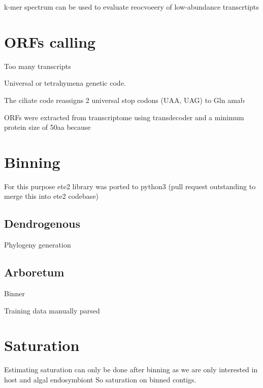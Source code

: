 k-mer spectrum can be used to evaluate reocvoeery of low-abundance transcrtipts \citep{Pop2009}



\section{ORFs calling}

Too many transcripts 

Universal or tetrahymena genetic code.

The ciliate code reassigns 2 universal stop codons (UAA, UAG) to Gln amab





ORFs were extracted from transcriptome using transdecoder and a minimum protein size of 50aa
because


\section{Binning}
For this purpose ete2 library was ported to python3 (pull request outstanding to merge this into ete2 codebase)


\subsection{Dendrogenous}
Phylogeny generation

\subsection{Arboretum}
Binner 

Training data manually parsed



\section{Saturation}
Estimating saturation can only be done after binning as we are only interested in host and algal endosymbiont
So saturation on binned contigs.






